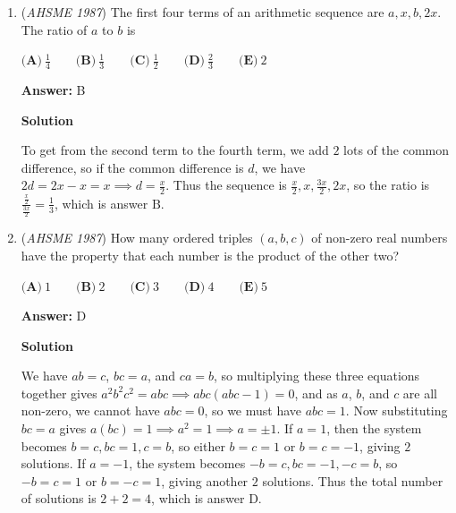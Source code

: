 \begin{enumerate}
$\textbf{(A)}\ \text{between 10 and 11} \qquad \textbf{(B)}\ 12 \qquad \textbf{(C)}\ \text{between 15 and 16}\qquad\\ \textbf{(D)}\ \text{between 16 and 17}\qquad \textbf{(E)}\ 17$

 \textbf{Answer: }C



\textbf{Solution}

Using Pythagoras' Theorem, $BD = \sqrt{3^2 + 4^2} = 5$, and $AD = \sqrt{(13 - 3)^2 + 4^2} = \sqrt{116}$. Thus the sum is $5 + \sqrt{116}$, and as $100 < 116 < 121$, $10 < \sqrt{116} < 11$, so that the sum is between $5+10$ and $5+11$, or $15$ and $16$, which is answer $\boxed{\text{C}}$.

 


	\item (\textit{AHSME 1987}) The first four terms of an arithmetic sequence are $a, x, b, 2x$. The ratio of $a$ to $b$ is


 $\textbf{(A)}\ \frac{1}{4} \qquad \textbf{(B)}\ \frac{1}{3} \qquad \textbf{(C)}\ \frac{1}{2} \qquad \textbf{(D)}\ \frac{2}{3}\qquad \textbf{(E)}\ 2$

 \textbf{Answer: }B



\textbf{Solution}

To get from the second term to the fourth term, we add $2$ lots of the common difference, so if the common difference is $d$, we have $2d = 2x -x = x \implies d = \frac{x}{2}$. Thus the sequence is $\frac{x}{2}, x, \frac{3x}{2}, 2x$, so the ratio is $\frac{\frac{x}{2}}{\frac{3x}{2}} = \frac{1}{3}$, which is answer $\boxed{\text{B}}$.

 


	\item (\textit{AHSME 1987}) How many ordered triples $(a, b, c)$ of non-zero real numbers have the property that each number is the product of the other two?


 $\textbf{(A)}\ 1 \qquad \textbf{(B)}\ 2 \qquad \textbf{(C)}\ 3 \qquad \textbf{(D)}\ 4 \qquad \textbf{(E)}\ 5$

 \textbf{Answer: }D



\textbf{Solution}

We have $ab = c$, $bc = a$, and $ca = b$, so multiplying these three equations together gives $a^{2}b^{2}c^{2} = abc \implies abc(abc-1)=0$, and as $a$, $b$, and $c$ are all non-zero, we cannot have $abc = 0$, so we must have $abc = 1$. Now substituting $bc = a$ gives $a(bc) = 1 \implies a^2 = 1 \implies a = \pm 1$. If $a = 1$, then the system becomes $b = c, bc = 1, c = b$, so either $b = c = 1$ or $b = c = -1$, giving $2$ solutions. If $a = -1$, the system becomes $-b = c, bc = -1, -c = b$, so $-b = c = 1$ or $b = -c = 1$, giving another $2$ solutions. Thus the total number of solutions is $2 + 2 = 4$, which is answer $\boxed{\text{D}}$.


\end{enumerate}
